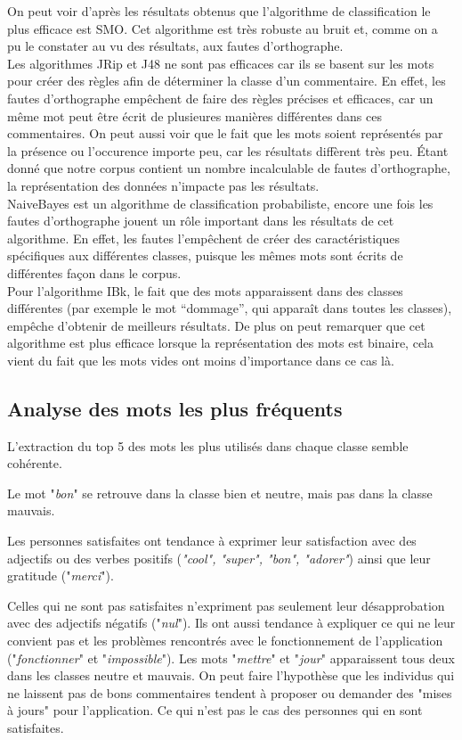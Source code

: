 \documentclass[a4paper, 11pt]{article}
\begin{document}
On peut voir d'après les résultats obtenus que l'algorithme de classification le plus efficace est SMO. Cet algorithme est très robuste au bruit et, comme on a pu le constater au vu des résultats, aux fautes d'orthographe.\\

Les algorithmes JRip et J48 ne sont pas efficaces car ils se basent sur les mots pour créer des règles afin de déterminer la classe d'un commentaire. En effet, les fautes d'orthographe empêchent de faire des règles précises et efficaces, car un même mot peut être écrit de plusieures manières différentes dans ces commentaires.
On peut aussi voir que le fait que les mots soient représentés par la présence ou l'occurence importe peu, car les résultats diffèrent très peu. \'{E}tant donné que notre corpus contient un nombre incalculable de fautes d'orthographe, la représentation des données n'impacte pas les résultats.\\

NaiveBayes est un algorithme de classification probabiliste, encore une fois les fautes d'orthographe jouent un rôle important dans les résultats de cet algorithme. En effet, les fautes l'empêchent de créer des caractéristiques spécifiques aux différentes classes, puisque les mêmes mots sont écrits de différentes façon dans le corpus.\\

Pour l'algorithme IBk, le fait que des mots apparaissent dans des classes différentes (par exemple le mot ``dommage'', qui apparaît dans toutes les classes), empêche d'obtenir de meilleurs résultats. De plus on peut remarquer que cet algorithme est plus efficace lorsque la représentation des mots est binaire, cela vient du fait que les mots vides ont moins d'importance dans ce cas là.

\subsection{Analyse des mots les plus fréquents}
L'extraction du top 5 des mots les plus utilisés dans chaque classe semble cohérente.

Le mot "\textit{bon}" se retrouve dans la classe bien et neutre, mais pas dans la classe mauvais.

Les personnes satisfaites ont tendance à exprimer leur satisfaction avec des adjectifs ou des verbes positifs (\textit{"cool", "super", "bon", "adorer"}) ainsi que leur gratitude ("\textit{merci}").  

Celles qui ne sont pas satisfaites n'expriment pas seulement leur désapprobation avec des adjectifs négatifs ("\textit{nul}"). Ils ont aussi tendance à expliquer ce qui ne leur convient pas et les problèmes rencontrés avec le fonctionnement de l'application ("\textit{fonctionner}" et "\textit{impossible}"). Les mots "\textit{mettre}" et "\textit{jour}" apparaissent tous deux dans les classes neutre et mauvais. On peut faire l'hypothèse que les individus qui ne laissent pas de bons commentaires tendent à proposer ou demander des "mises à jours" pour l'application. Ce qui n'est pas le cas des personnes qui en sont satisfaites.\\
\end{document}
